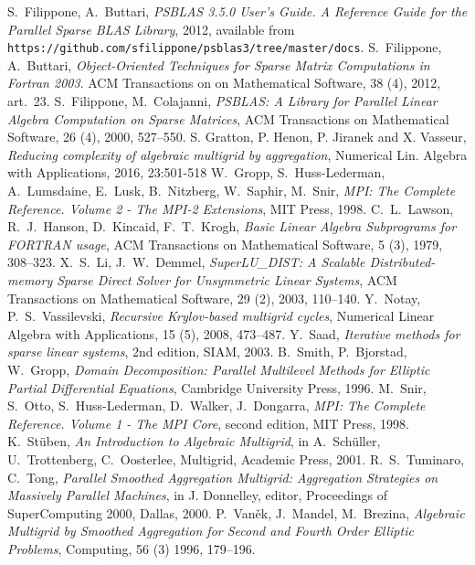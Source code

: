 \begin{thebibliography}{99}
%
S.~Filippone, A.~Buttari,
{\em PSBLAS 3.5.0 User's Guide. A Reference Guide for the Parallel Sparse BLAS Library}, 2012,
available from \texttt{https://github.com/sfilippone/psblas3/tree/master/docs}.
%
S.~Filippone, A.~Buttari,
{\em Object-Oriented Techniques for Sparse Matrix Computations in Fortran 2003}.
ACM Transactions on on Mathematical Software, 38 (4), 2012, art.~23.
%
S.~Filippone, M.~Colajanni,
{\em PSBLAS: A Library for Parallel Linear Algebra
Computation on Sparse Matrices},
ACM Transactions on Mathematical Software, 26 (4), 2000, 527--550.
%
S. Gratton, P. Henon, P. Jiranek and X. Vasseur,
  {\em Reducing complexity of algebraic multigrid by aggregation},
Numerical Lin. Algebra with Applications, 2016, 23:501-518
%
W.~Gropp, S.~Huss-Lederman, A.~Lumsdaine, E.~Lusk, B.~Nitzberg, W.~Saphir, M.~Snir,
{\em MPI: The Complete Reference. Volume 2 - The MPI-2 Extensions},
MIT Press, 1998.
%
C.~L.~Lawson, R.~J.~Hanson, D.~Kincaid, F.~T.~Krogh,
\emph{Basic Linear Algebra Subprograms for FORTRAN usage},
ACM Transactions on Mathematical Software, 5 (3), 1979, 308--323.
%
X.~S.~Li, J.~W.~Demmel,
{\em SuperLU\_DIST: A Scalable Distributed-memory
Sparse Direct Solver for Unsymmetric Linear Systems},
ACM Transactions on Mathematical Software, 29 (2), 2003, 110--140.
%
Y.~Notay, P.~S.~Vassilevski,
{\em Recursive Krylov-based multigrid cycles},
Numerical Linear Algebra with Applications, 15 (5), 2008, 473--487.
%
Y.~Saad,
{\em Iterative methods for sparse linear systems}, 2nd edition, SIAM, 2003.
%
B.~Smith, P.~Bjorstad, W.~Gropp,
{\em Domain Decomposition: Parallel Multilevel Methods for Elliptic
Partial Differential Equations},
Cambridge University Press, 1996.
%
M.~Snir, S.~Otto, S.~Huss-Lederman, D.~Walker, J.~Dongarra,
{\em MPI: The Complete Reference. Volume 1 - The MPI Core}, second edition,
MIT Press, 1998.
%
K.~St\"{u}ben,
{\em An Introduction to Algebraic Multigrid},
in A.~Sch\"{u}ller, U.~Trottenberg, C.~Oosterlee, Multigrid,
Academic Press, 2001.
%
R.~S.~Tuminaro, C.~Tong,
{\em Parallel Smoothed Aggregation Multigrid: Aggregation Strategies on Massively Parallel Machines}, in J. Donnelley, editor, Proceedings of SuperComputing 2000, Dallas, 2000.
%
P.~Van\v{e}k, J.~Mandel, M.~Brezina,
{\em Algebraic Multigrid by Smoothed Aggregation for Second and Fourth Order Elliptic Problems},
Computing, 56 (3) 1996, 179--196.
%
\end{thebibliography}
